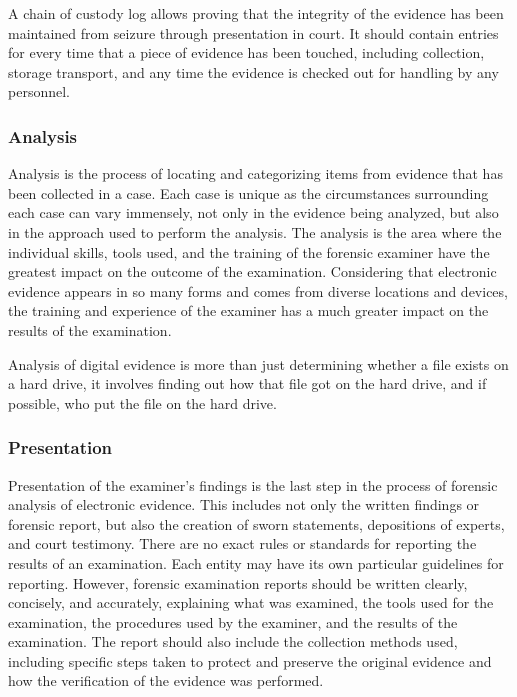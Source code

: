 A chain of custody log allows proving that the integrity of the evidence has been maintained from seizure
through presentation in court. It should contain entries for every time that a piece of evidence
has been touched, including collection, storage transport, and any time the evidence is checked out for
handling by any personnel.

\subsubsection{Analysis}

Analysis is the process of locating and categorizing items from evidence
that has been collected in a case. Each case is unique as the
circumstances surrounding each case can vary immensely, not only in the evidence being analyzed, but also in the
approach used to perform the analysis. The analysis is the area where
the individual skills, tools used, and the training of the forensic examiner have
the greatest impact on the outcome of the examination. Considering that electronic evidence
appears in so many forms and comes from diverse locations and devices,
the training and experience of the examiner has a much greater impact
on the results of the examination.

Analysis of digital evidence is more than just determining whether a file exists on a hard drive, it involves finding out how
that file got on the hard drive, and if possible, who put the file on the hard drive.

\subsubsection{Presentation}

Presentation of the examiner's findings is the last step in the process of forensic
analysis of electronic evidence. This includes not only the written findings or forensic
report, but also the creation of sworn statements, depositions of experts, and court testimony.
There are no exact rules or standards for reporting the results of an
examination. Each entity may have its own particular guidelines
for reporting. However, forensic examination reports should be written clearly, concisely,
and accurately, explaining what was examined, the tools used for the examination,
the procedures used by the examiner, and the results of the examination.
The report should also include the collection methods used, including specific steps
taken to protect and preserve the original evidence and how the verification of the
evidence was performed.

